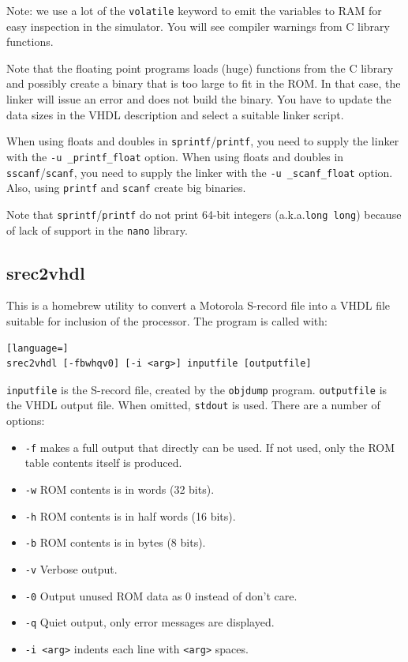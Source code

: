 \documentclass[12pt]{article}
\begin{document}
Note: we use a lot of the \lstinline|volatile| keyword to emit the variables to RAM for easy inspection in the simulator. You will see compiler warnings from C library functions.

Note that the floating point programs loads (huge) functions from the C library and possibly create a binary that is too large to fit in the ROM. In that case, the linker will issue an error and does not build the binary. You have to update the data sizes in the VHDL description and select a suitable linker script.

When using floats and doubles in \lstinline|sprintf|/\lstinline|printf|, you need to supply the linker with the \lstinline|-u _printf_float| option. When using floats and doubles in \lstinline|sscanf|/\lstinline|scanf|, you need to supply the linker with the \lstinline|-u _scanf_float| option. Also, using \lstinline|printf| and \lstinline|scanf| create big binaries.

Note that \lstinline|sprintf|/\lstinline|printf| do not print 64-bit integers (a.k.a.\@ \lstinline|long long|) because of lack of support in the \lstinline|nano| library.

\subsection{srec2vhdl}
This is a homebrew utility to convert a Motorola S-record file into a VHDL file suitable for inclusion of the processor. The program is called with:

\begin{lstlisting}[language=]
srec2vhdl [-fbwhqv0] [-i <arg>] inputfile [outputfile]
\end{lstlisting}

\lstinline|inputfile| is the S-record file, created by the \lstinline|objdump| program. \lstinline|outputfile| is the VHDL output file. When omitted, \lstinline|stdout| is used. There are a number of options:

\begin{itemize}
\item \lstinline|-f| makes a full output that directly can be used. If not used, only the ROM table contents itself is produced.
\item \lstinline|-w| ROM contents is in words (32 bits).
\item \lstinline|-h| ROM contents is in half words (16 bits).
\item \lstinline|-b| ROM contents is in bytes (8 bits).
\item \lstinline|-v| Verbose output.
\item \lstinline|-0| Output unused ROM data as 0 instead of don't care.
\item \lstinline|-q| Quiet output, only error messages are displayed.
\item \lstinline|-i <arg>| indents each line with \lstinline|<arg>| spaces.
\end{itemize}
\end{document}
